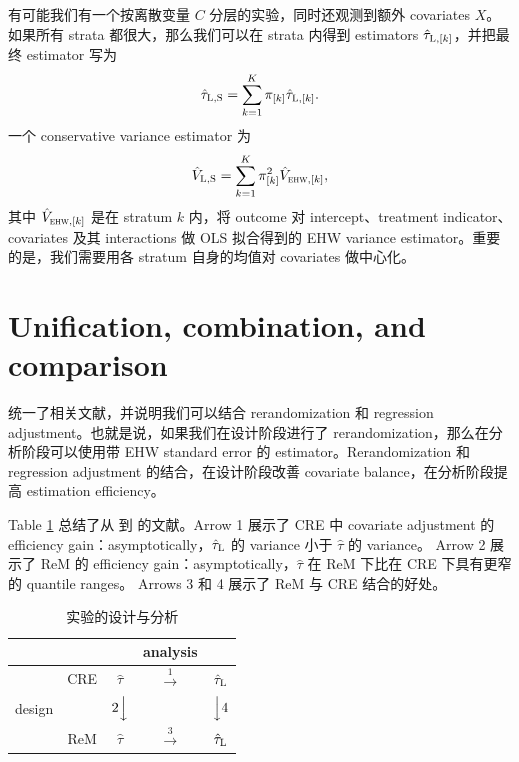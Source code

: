 有可能我们有一个按离散变量 $C$ 分层的实验，同时还观测到额外 covariates $X$。如果所有 strata 都很大，那么我们可以在 strata 内得到 \citet{lin2013} estimators $\hat{\tau}_{\textsc{L},[k]}$，并把最终 estimator 写为
$$
\hat{\tau}_{\textsc{L},\textsc{S}} = \sum_{k=1}^K \pi_{[k]} \hat{\tau}_{\textsc{L},[k]} . 
$$
一个 conservative variance estimator 为
$$
\hat{V}_{\textsc{L},\textsc{S}} =  \sum_{k=1}^K \pi_{[k]}^2 \hat{V}_{\textsc{ehw},[k]},
$$
其中 $\hat{V}_{\textsc{ehw},[k]}$ 是在 stratum $k$ 内，将 outcome 对 intercept、treatment indicator、covariates 及其 interactions 做 OLS 拟合得到的 EHW variance estimator。重要的是，我们需要用各 stratum 自身的均值对 covariates 做中心化。
 
\section{Unification, combination, and comparison}
\label{sec::unification-rem-regadj}

\citet{li2019rerandomization} 统一了相关文献，并说明我们可以结合 rerandomization 和 regression adjustment。也就是说，如果我们在设计阶段进行了 rerandomization，那么在分析阶段可以使用带 EHW standard error 的 \citet{lin2013} estimator。Rerandomization 和 regression adjustment 的结合，在设计阶段改善 covariate balance，在分析阶段提高 estimation efficiency。

Table \ref{tb::rerandomization-regression} 总结了从 \citet{Neyman:1923} 到 \citet{li2019rerandomization} 的文献。Arrow 1 展示了 CRE 中 covariate adjustment 的 efficiency gain：asymptotically，$\hat\tau_\textsc{L}$ 的 variance 小于 $\hat\tau$ 的 variance。
Arrow 2 展示了 ReM 的 efficiency gain：asymptotically，$\hat{\tau}$ 在 ReM 下比在 CRE 下具有更窄的 quantile ranges。
Arrows 3 和 4 展示了 ReM 与 CRE 结合的好处。

\begin{table}
\centering
\caption{实验的设计与分析}\label{tb::design-analysis-2x2}
\label{tb::rerandomization-regression}
\begin{tabular}{c|cccc}
\hline 
  & & & analysis & \\
  \hline 
  & CRE & $\hat\tau$ \citep{Neyman:1923} &  $\stackrel{1}{\longrightarrow}$  &  $\hat\tau_\textsc{L}$ \citep{lin2013} \\
  design&  &  $2\Big\downarrow$ && $  \Big\downarrow 4$ \\
  & ReM & $\hat\tau$  \citep{li2018asymptotic} &  $\stackrel{3}{\longrightarrow}$  &$\hat\tau_\textsc{L}$ \citep{li2019rerandomization}  \\
  \hline 
\end{tabular}
\end{table}

